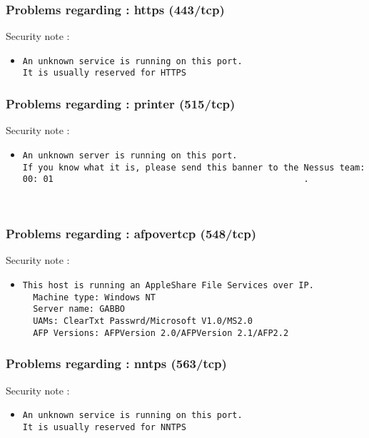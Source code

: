 \documentclass{article}
\begin{document}
\subsubsection{Problems regarding : https (443/tcp)}
Security note :\\
\begin{itemize}
\item \begin{verbatim}
An unknown service is running on this port.
It is usually reserved for HTTPS
\end{verbatim}\end{itemize}
\subsubsection{Problems regarding : printer (515/tcp)}
Security note :\\
\begin{itemize}
\item \begin{verbatim}
An unknown server is running on this port.
If you know what it is, please send this banner to the Nessus team:
00: 01                                                 .              
                               


\end{verbatim}\end{itemize}
\subsubsection{Problems regarding : afpovertcp (548/tcp)}
Security note :\\
\begin{itemize}
\item \begin{verbatim}
This host is running an AppleShare File Services over IP.
  Machine type: Windows NT
  Server name: GABBO
  UAMs: ClearTxt Passwrd/Microsoft V1.0/MS2.0
  AFP Versions: AFPVersion 2.0/AFPVersion 2.1/AFP2.2

\end{verbatim}\end{itemize}
\subsubsection{Problems regarding : nntps (563/tcp)}
Security note :\\
\begin{itemize}
\item \begin{verbatim}
An unknown service is running on this port.
It is usually reserved for NNTPS
\end{verbatim}\end{itemize}
\end{document}
